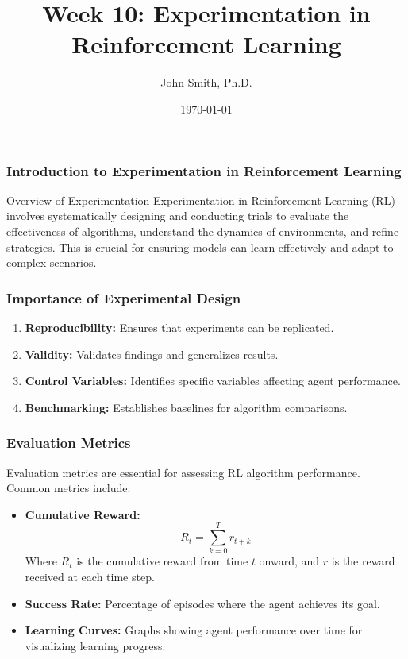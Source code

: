\documentclass[aspectratio=169]{beamer}
\title[Experimentation in RL]{Week 10: Experimentation in Reinforcement Learning}
\author[J. Smith]{John Smith, Ph.D.}
\institute[University Name]{
  Department of Computer Science\\
  University Name\\
  Email: email@university.edu\\
  Website: www.university.edu
}
\date{\today}
\begin{document}
\frame{\titlepage}

\begin{frame}[fragile]
    \frametitle{Introduction to Experimentation in Reinforcement Learning}
    \begin{block}{Overview of Experimentation}
        Experimentation in Reinforcement Learning (RL) involves systematically designing and conducting trials to evaluate the effectiveness of algorithms, understand the dynamics of environments, and refine strategies. This is crucial for ensuring models can learn effectively and adapt to complex scenarios.
    \end{block}
\end{frame}

\begin{frame}[fragile]
    \frametitle{Importance of Experimental Design}
    \begin{enumerate}
        \item \textbf{Reproducibility:} Ensures that experiments can be replicated.
        \item \textbf{Validity:} Validates findings and generalizes results.
        \item \textbf{Control Variables:} Identifies specific variables affecting agent performance.
        \item \textbf{Benchmarking:} Establishes baselines for algorithm comparisons.
    \end{enumerate}
\end{frame}

\begin{frame}[fragile]
    \frametitle{Evaluation Metrics}
    Evaluation metrics are essential for assessing RL algorithm performance. Common metrics include:
    \begin{itemize}
        \item \textbf{Cumulative Reward:}
        \begin{equation}
            R_t = \sum_{k=0}^{T} r_{t+k}
        \end{equation}
        Where \(R_t\) is the cumulative reward from time \(t\) onward, and \(r\) is the reward received at each time step.
        
        \item \textbf{Success Rate:} Percentage of episodes where the agent achieves its goal.
        
        \item \textbf{Learning Curves:} Graphs showing agent performance over time for visualizing learning progress.
    \end{itemize}
\end{frame}
\end{document}
